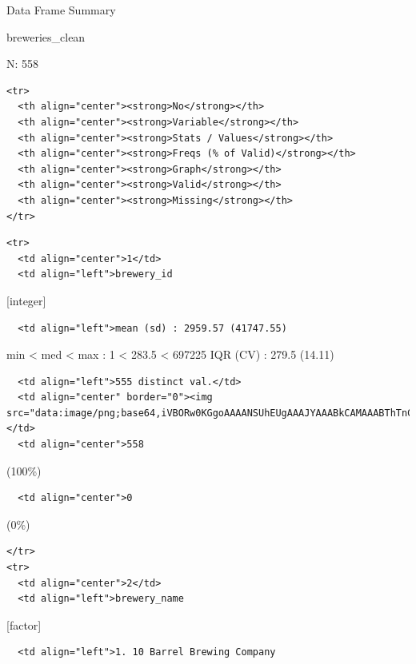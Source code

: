 \documentclass[]{article}
\begin{document}
Data Frame Summary

breweries\_clean

N: 558

\begin{verbatim}
<tr>
  <th align="center"><strong>No</strong></th>
  <th align="center"><strong>Variable</strong></th>
  <th align="center"><strong>Stats / Values</strong></th>
  <th align="center"><strong>Freqs (% of Valid)</strong></th>
  <th align="center"><strong>Graph</strong></th>
  <th align="center"><strong>Valid</strong></th>
  <th align="center"><strong>Missing</strong></th>
</tr>
\end{verbatim}

\begin{verbatim}
<tr>
  <td align="center">1</td>
  <td align="left">brewery_id
\end{verbatim}

{[}integer{]}

\begin{verbatim}
  <td align="left">mean (sd) : 2959.57 (41747.55)
\end{verbatim}

min \textless{} med \textless{} max : 1 \textless{} 283.5 \textless{}
697225 IQR (CV) : 279.5 (14.11)

\begin{verbatim}
  <td align="left">555 distinct val.</td>
  <td align="center" border="0"><img src="data:image/png;base64,iVBORw0KGgoAAAANSUhEUgAAAJYAAABkCAMAAABThTnCAAAADFBMVEX9/v2mpqby8vL9/v28xacEAAAABHRSTlP///8AQCqp9AAAAJNJREFUaIHt27ENgzAAAEET9t+ZIiAiBSF9ZRd3E/wCP/YljdkBz2QV36ztNrnndGZ9LrLeyCpkFbIKWYWsQlYhq5BVyCpkFbIKWYWsQlYhq5BVyCpkFbIKWYWsQlYhq5BVyCpkFbIKWYWsQlYhq5BVyCpkFbIKWYWsQlYhq5BVyCpkFbIKWcXfrDXdT9ZyZBWLZh3aJKoJ7TmyggAAAABJRU5ErkJggg=="></td>
  <td align="center">558
\end{verbatim}

(100\%)

\begin{verbatim}
  <td align="center">0
\end{verbatim}

(0\%)

\begin{verbatim}
</tr>
<tr>
  <td align="center">2</td>
  <td align="left">brewery_name
\end{verbatim}

{[}factor{]}

\begin{verbatim}
  <td align="left">1. 10 Barrel Brewing Company
\end{verbatim}
\end{document}
